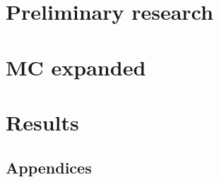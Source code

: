 \part{Preliminary research}
\begin{multicols}{3}
   
   

\newpage
\end{multicols}
\part{MC expanded}\label{part:mcexpanded}
\begin{multicols}{3}
   

   
   

   


\end{multicols}
\part{Results}
\begin{multicols}{3}
   

   
   

\end{multicols}

\begin{appendices}
   \part{Appendices}
   
   
\end{appendices}


